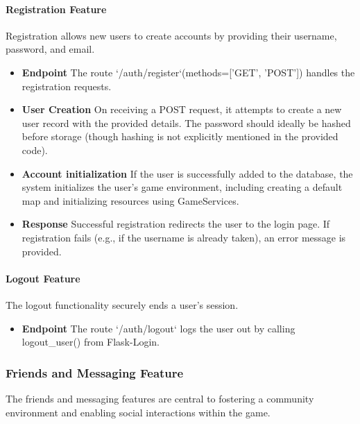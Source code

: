 \documentclass[12pt]{article}
\begin{document}
\paragraph{Registration Feature}
Registration allows new users to create accounts by providing their username, password, and email.
\begin{itemize}
    \item \textbf{Endpoint} The route `/auth/register`(methods=['GET', 'POST']) handles the registration requests.
    \item \textbf{User Creation} On receiving a POST request, it attempts to create a new user record with the provided details. The password should ideally be hashed before storage (though hashing is not explicitly mentioned in the provided code).
    \item \textbf{Account initialization} If the user is successfully added to the database, the system initializes the user's game environment, including creating a default map and initializing resources using GameServices.
    \item \textbf{Response} Successful registration redirects the user to the login page. If registration fails (e.g., if the username is already taken), an error message is provided.
\end{itemize}
\paragraph{Logout Feature}
The logout functionality securely ends a user's session.
\begin{itemize}
    \item \textbf{Endpoint} The route `/auth/logout` logs the user out by calling logout\_user() from Flask-Login.
\end{itemize}
\subsubsection{Friends and Messaging Feature}
The friends and messaging features are central to fostering a community environment and enabling social interactions within the game.
\end{document}
